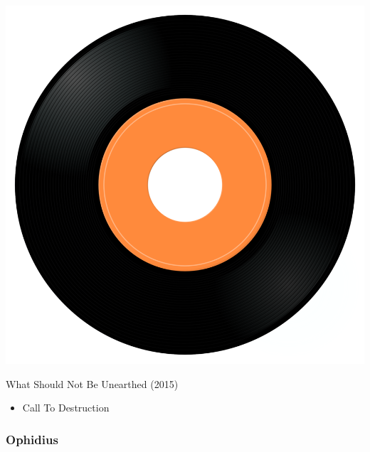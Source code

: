 \begin{minipage}[t]{0.25\textwidth}\vspace{0pt}
\captionsetup{type=figure}
\includegraphics[width=\textwidth]{Images/cover.png}
\caption*{What Should Not Be Unearthed (2015)}
\end{minipage}
\begin{minipage}[t]{0.25\textwidth}\vspace{0pt}
\begin{itemize}[nosep,leftmargin=1em,labelwidth=*,align=left]
	\setlength{\itemsep}{0pt}
	\item Call To Destruction
\end{itemize}
\end{minipage}

\subsubsection{Ophidius}

